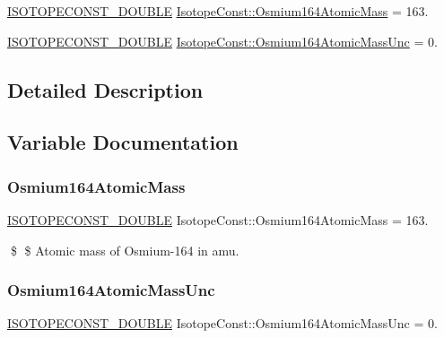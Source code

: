 \begin{DoxyCompactItemize}
\item 
\mbox{\hyperlink{group___isotope_const-_macros_ga8f45a7272ce02c0b4c65c44636ed719a}{I\+S\+O\+T\+O\+P\+E\+C\+O\+N\+S\+T\+\_\+\+D\+O\+U\+B\+LE}} \mbox{\hyperlink{group___isotope_const-_osmium-_os164_gadbe639ca37c9c6b9bd5c3495624156e8}{Isotope\+Const\+::\+Osmium164\+Atomic\+Mass}} = 163.
\item 
\mbox{\hyperlink{group___isotope_const-_macros_ga8f45a7272ce02c0b4c65c44636ed719a}{I\+S\+O\+T\+O\+P\+E\+C\+O\+N\+S\+T\+\_\+\+D\+O\+U\+B\+LE}} \mbox{\hyperlink{group___isotope_const-_osmium-_os164_ga773b8861bb4275b5b05c35e31b9dff46}{Isotope\+Const\+::\+Osmium164\+Atomic\+Mass\+Unc}} = 0.
\end{DoxyCompactItemize}


\subsection{Detailed Description}


\subsection{Variable Documentation}
\mbox{\label{group___isotope_const-_osmium-_os164_gadbe639ca37c9c6b9bd5c3495624156e8}} 
\subsubsection{\texorpdfstring{Osmium164\+Atomic\+Mass}{Osmium164AtomicMass}}
{\footnotesize\ttfamily \mbox{\hyperlink{group___isotope_const-_macros_ga8f45a7272ce02c0b4c65c44636ed719a}{I\+S\+O\+T\+O\+P\+E\+C\+O\+N\+S\+T\+\_\+\+D\+O\+U\+B\+LE}} Isotope\+Const\+::\+Osmium164\+Atomic\+Mass = 163.}

\$ \$ Atomic mass of Osmium-\/164 in amu. \mbox{\label{group___isotope_const-_osmium-_os164_ga773b8861bb4275b5b05c35e31b9dff46}} 
\subsubsection{\texorpdfstring{Osmium164\+Atomic\+Mass\+Unc}{Osmium164AtomicMassUnc}}
{\footnotesize\ttfamily \mbox{\hyperlink{group___isotope_const-_macros_ga8f45a7272ce02c0b4c65c44636ed719a}{I\+S\+O\+T\+O\+P\+E\+C\+O\+N\+S\+T\+\_\+\+D\+O\+U\+B\+LE}} Isotope\+Const\+::\+Osmium164\+Atomic\+Mass\+Unc = 0.}

